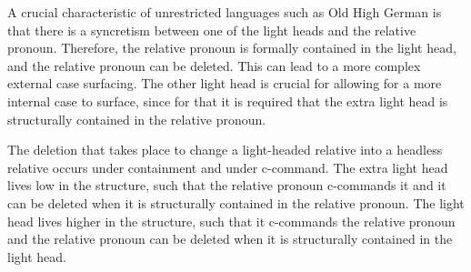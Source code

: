 A crucial characteristic of unrestricted languages such as Old High German is that there is a syncretism between one of the light heads and the relative pronoun. Therefore, the relative pronoun is formally contained in the light head, and the relative pronoun can be deleted. This can lead to a more complex external case surfacing. The other light head is crucial for allowing for a more internal case to surface, since for that it is required that the extra light head is structurally contained in the relative pronoun.

The deletion that takes place to change a light-headed relative into a headless relative occurs under containment and under c-command. The extra light head lives low in the structure, such that the relative pronoun c-commands it and it can be deleted when it is structurally contained in the relative pronoun. The light head lives higher in the structure, such that it c-commands the relative pronoun and the relative pronoun can be deleted when it is structurally contained in the light head.
